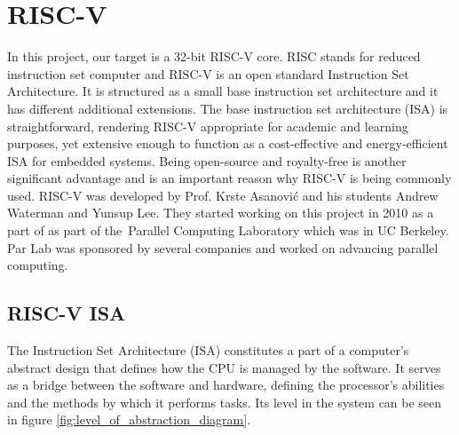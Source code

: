 \clearpage
\chapter{RISC-V}\label{Ch8}
In this project, our target is a 32-bit RISC-V core. RISC stands for reduced instruction set computer and RISC-V is an open standard Instruction Set Architecture. \cite{riscvorgabout} It is structured as a small base instruction set architecture and it has different additional extensions. The base instruction set architecture (ISA) is straightforward, rendering RISC-V appropriate for academic and learning purposes, yet extensive enough to function as a cost-effective and energy-efficient ISA for embedded systems. \cite{watermanriscv} Being open-source and royalty-free is another significant advantage and is an important reason why RISC-V is being commonly used. 
RISC-V was developed by Prof. Krste Asanović and his students Andrew Waterman and Yunsup Lee. They started working on this project in 2010 as a part of as part of the Parallel Computing Laboratory which was in UC Berkeley. Par Lab was sponsored by several companies and worked on advancing parallel computing.

\section{RISC-V ISA}
The Instruction Set Architecture (ISA) constitutes a part of a computer’s abstract design that defines how the CPU is managed by the software. It serves as a bridge between the software and hardware, defining the processor’s abilities and the methods by which it performs tasks. Its level in the system can be seen in figure \ref{fig:level_of_abstraction_diagram}.


